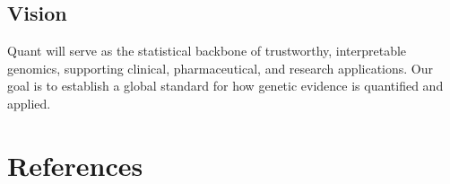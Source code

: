 \documentclass[preprint,12pt,fleqn]{article}
\begin{document}
\subsection{Vision}

Quant will serve as the statistical backbone of trustworthy, interpretable genomics, supporting clinical, pharmaceutical, and research applications. Our goal is to establish a global standard for how genetic evidence is quantified and applied.

\clearpage

\section{References}
\clearpage


\end{document}
